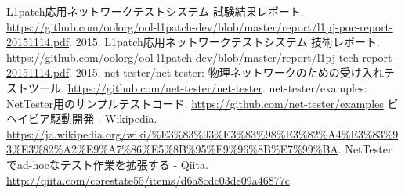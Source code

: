 
\begin{thebibliography}{99}
         L1patch応用ネットワークテストシステム 試験結果レポート.
         \url{https://github.com/oolorg/ool-l1patch-dev/blob/master/report/l1pj-poc-report-20151114.pdf}.
         2015.
         L1patch応用ネットワークテストシステム 技術レポート.
         \url{https://github.com/oolorg/ool-l1patch-dev/blob/master/report/l1pj-tech-report-20151114.pdf}.
         2015.
         net-tester/net-tester: 物理ネットワークのための受け入れテストツール.
         \url{https://github.com/net-tester/net-tester}.
         net-tester/examples: NetTester用のサンプルテストコード.
         \url{https://github.com/net-tester/examples}
         ビヘイビア駆動開発 - Wikipedia.
         \url{https://ja.wikipedia.org/wiki/%E3%83%93%E3%83%98%E3%82%A4%E3%83%93%E3%82%A2%E9%A7%86%E5%8B%95%E9%96%8B%E7%99%BA}.
         NetTesterでad-hocなテスト作業を拡張する - Qiita.
         \url{http://qiita.com/corestate55/items/d6a8cdc03de09a46877c}
\end{thebibliography}

